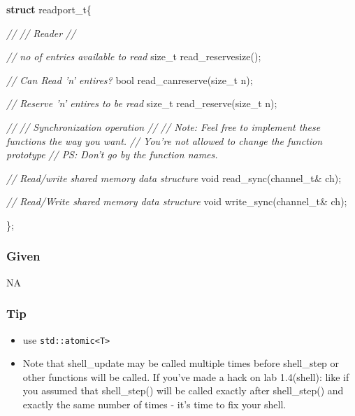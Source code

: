 \documentclass[]{book}
\newenvironment{Shaded}{}{}
\newcommand{\KeywordTok}[1]{\textbf{{#1}}}
\newcommand{\DataTypeTok}[1]{\textcolor[rgb]{0.50,0.00,0.00}{{#1}}}
\newcommand{\CommentTok}[1]{\textcolor[rgb]{0.50,0.50,0.50}{\textit{{#1}}}}
\newcommand{\NormalTok}[1]{{#1}}
\begin{document}
\begin{Shaded}
\begin{Highlighting}[]

\KeywordTok{struct} \NormalTok{readport_t\{}


  \CommentTok{//}
  \CommentTok{// Reader}
  \CommentTok{//}


  \CommentTok{// no of entries available to read}
  \NormalTok{size_t read_reservesize();}

  \CommentTok{// Can Read 'n' entires?}
  \NormalTok{bool read_canreserve(size_t n);}

  \CommentTok{// Reserve 'n' entires to be read}
  \NormalTok{size_t read_reserve(size_t n);}



  \CommentTok{//}
  \CommentTok{// Synchronization operation}
  \CommentTok{//}
  \CommentTok{// Note: Feel free to implement these functions the way you want.}
  \CommentTok{//       You're not allowed to change the function prototype}
  \CommentTok{// PS:   Don't go by the function names.}

  \CommentTok{// Read/write shared memory data structure}
  \DataTypeTok{void} \NormalTok{read_sync(channel_t& ch);}

  \CommentTok{// Read/Write shared memory data structure}
  \DataTypeTok{void} \NormalTok{write_sync(channel_t& ch);}

\NormalTok{\};}
\end{Highlighting}
\end{Shaded}

\subsubsection*{Given}\label{given-8}

NA

\subsubsection*{Tip}\label{tip-8}

\begin{itemize}
\itemsep1pt\parskip0pt
\item
  use \texttt{std::atomic\textless{}T\textgreater{}}
\item
  Note that shell\_update may be called multiple times before
  shell\_step or other functions will be called. If you've made a hack
  on lab 1.4(shell): like if you assumed that shell\_step() will be
  called exactly after shell\_step() and exactly the same number of
  times - it's time to fix your shell.
\end{itemize}
\end{document}
